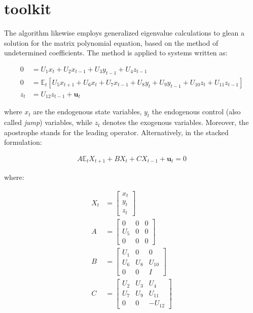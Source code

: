 \documentclass{pracamgr}
\numberwithin{equation}{section}
\begin{document}
\section{\citet{uhlig1998toolkit} toolkit}

The \citet{uhlig1998toolkit} algorithm likewise employs generalized eigenvalue calculations to glean a solution for the matrix polynomial equation, based on the method of undetermined coefficients. The method is applied to systems written as:

\begin{align}
0 &= U_{1}x_{t} + U_{2}x_{t-1} + U_{3}y_{t-1} + U_{4}z_{t-1} \nonumber \\
0 &=\mathbb{E}_{t} \left[U_{5}x_{t+1} + U_{6}x_{t} + U_{7}x_{t-1} + U_{8}y_{t} + U_{9}y_{t-1} + U_{10}z_{t} + U_{11}z_{t-1} \right] \nonumber \\
z_{t} &= U_{12}z_{t-1} +  \mathbf{u}_{t}
\end{align}

where $x_{t}$ are the endogenous state variables, $y_{t}$ the endogenous control (also called \textit{jump}) variables, while $z_{t}$ denotes the exogenous variables. Moreover, the apostrophe stands for the leading operator. Alternatively, in the stacked formulation:

\begin{align}
A\mathbb{E}_{t}X_{t+1} + BX_{t} + CX_{t-1} + \mathbf{u}_{t} = 0
\end{align}

where:

\begin{align}
X_{t} &=  \begin{bmatrix} x_{t} \\ y_{t} \\ z_{t} \end{bmatrix} \\
A &= \begin{bmatrix} 0 & 0 & 0 \\ U_{5} & 0 & 0 \\ 0 & 0 & 0 \end{bmatrix} \\
B &= \begin{bmatrix}  U_{1} & 0 & 0 \\ U_{6} & U_{8} & U_{10} \\ 0 & 0 & I \end{bmatrix} \\
C &= \begin{bmatrix}  U_{2} & U_{3} & U_{4} \\ U_{7} & U_{9} & U_{11} \\ 0 & 0 & -U_{12} \end{bmatrix} \\
\end{align}
\end{document}
